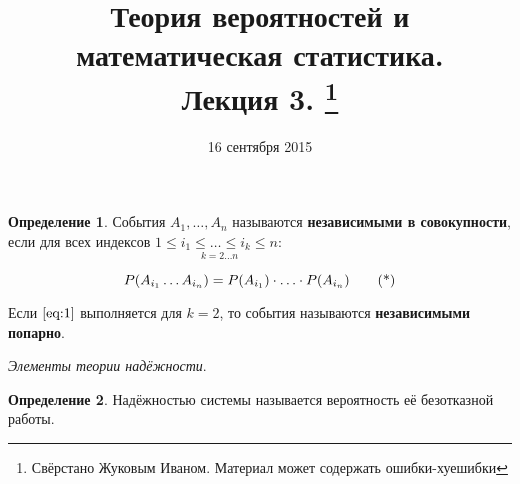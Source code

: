 \documentclass[a4paper, 12pt]{article}
\title{Теория вероятностей и математическая статистика.\\Лекция 3.
    \footnote{Свёрстано Жуковым Иваном. Материал может содержать ошибки-хуешибки}}
\author{}
\date{16 сентября 2015}
\theoremstyle{definition}
\newtheorem{Definition}{Определение}
\begin{document}
    \maketitle{}

    \begin{Definition}
        События \(A_1, \dots, A_n\) называются \textbf{независимыми в совокупности}, если для всех индексов
        \( \underset{k = 2 \ldots n}{ 1 \le i_1 \le \ldots \le i_k \le n:}\)

        \begin{equation}{\label{eq:1}}
            P(A_{i_1} \dots A_{i_n}) = P(A_{i_1}) \cdot \ldots \cdot P(A_{i_n}) \tag{*}
        \end{equation}

        Если \(\eqref{eq:1}\) выполняется для \(k = 2\), то события называются \textbf{независимыми попарно}.
    \end{Definition}

    \begin{center}
        \textit{Элементы теории надёжности}.
    \end{center}

    \begin{Definition}
        Надёжностью системы называется вероятность её безотказной работы.
    \end{Definition}
\end{document}
